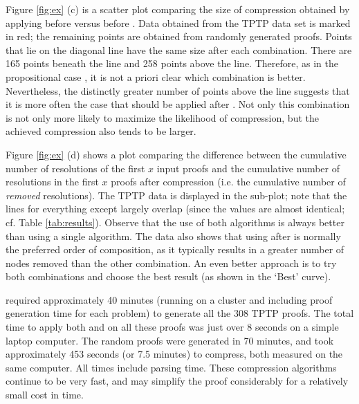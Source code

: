 {Figure \ref{fig:ex} (c) is a scatter plot comparing the size of compression obtained by applying {\FORPI} before {\GFOLU} versus {\GFOLU} before {\FORPI}. Data obtained from the TPTP data set is marked in red; the remaining points are obtained from randomly generated proofs. Points that lie on the diagonal line have the same size after each combination. There are 165 points beneath the line and 258 points above the line. Therefore, as in the propositional case \cite{LURPI}, it is not a priori clear which combination is better. Nevertheless, the distinctly greater number of points above the line suggests that it is more often the case that {\FORPI} should be applied after {\GFOLU}. Not only this combination is not only more likely to maximize the likelihood of compression, but the achieved compression also tends to be larger.

Figure \ref{fig:ex} (d) shows a plot comparing the difference between the cumulative number of resolutions of the first $x$ input proofs and the cumulative number of resolutions in the first $x$ proofs after compression (i.e. the cumulative number of \emph{removed} resolutions). The TPTP data is displayed in the sub-plot; note that the lines for everything except {\FORPI} largely overlap (since the values are almost identical; cf. Table \ref{tab:results}). Observe that the use of both algorithms is always better than using a single algorithm. The data also shows that using {\FORPI} after {\GFOLU} is normally the preferred order of composition, as it typically results in a greater number of nodes removed than the other combination. An even better approach is to try both combinations and choose the best result (as shown in the `Best' curve).  


{\SPASS} required approximately 40 minutes (running on a cluster and including proof generation time for each problem) to generate all the 308 TPTP proofs. The total time to apply both {\FORPI} and {\GFOLU} on all these proofs was just over 8 seconds on a simple laptop computer. The random proofs were generated in 70 minutes, and took approximately 453 seconds (or 7.5 minutes) to compress, both measured on the same computer.
All times include parsing time. These compression algorithms continue to be very fast, and may simplify the proof considerably for a relatively small cost in time.

}
